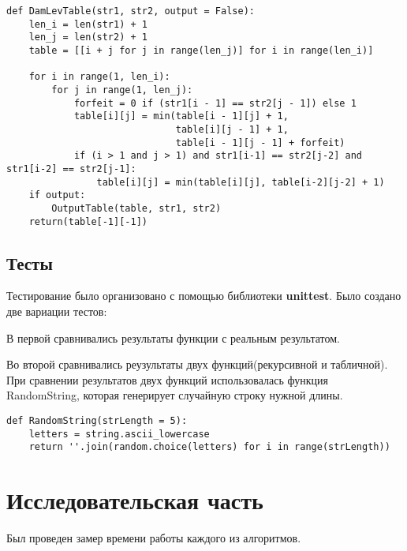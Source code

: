 \documentclass[12pt]{report}
\begin{document}
\begin{lstlisting}[label=some-code,caption=Функция нахождения расстояния Дамерау-Левенштейна матрично]
def DamLevTable(str1, str2, output = False):
    len_i = len(str1) + 1
    len_j = len(str2) + 1
    table = [[i + j for j in range(len_j)] for i in range(len_i)]
    
    for i in range(1, len_i):
        for j in range(1, len_j):
            forfeit = 0 if (str1[i - 1] == str2[j - 1]) else 1
            table[i][j] = min(table[i - 1][j] + 1,
                              table[i][j - 1] + 1,
                              table[i - 1][j - 1] + forfeit)
            if (i > 1 and j > 1) and str1[i-1] == str2[j-2] and str1[i-2] == str2[j-1]:
                table[i][j] = min(table[i][j], table[i-2][j-2] + 1)
    if output:        
        OutputTable(table, str1, str2)
    return(table[-1][-1])
\end{lstlisting}

\section{Тесты}
Тестирование было организовано с помощью библиотеки  \textbf{unittest}.
Было создано две вариации тестов:

В первой сравнивались результаты функции с реальным результатом.

Во второй сравнивались реузультаты двух функций(рекурсивной и табличной).
При сравнении результатов двух функций использовалась функция RandomString, которая генерирует случайную строку нужной длины.

\begin{lstlisting}[label=randStr,caption=Функция генерации случайной строки]
def RandomString(strLength = 5):
    letters = string.ascii_lowercase
    return ''.join(random.choice(letters) for i in range(strLength))
\end{lstlisting}


\chapter{Исследовательская часть}


Был проведен замер времени работы каждого из алгоритмов.
\end{document}
